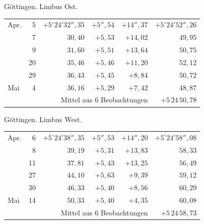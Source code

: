 \noindent\begin{minipage}[t]{.495\textwidth}\centering Göttingen. Limbus Ost.\par\smallskip
{\scriptsize\setlength{\tabcolsep}{1pt}\renewcommand{\arraystretch}{1.2}\begin{tabular}{lr|r|r|r|r|}
Apr.&5&$+5^\circ24'32''{,}35$&$+5''{,}54$&$+14''{,}37$&$+5^\circ24'52''{,}26$\\
&7&$30{,}40$&$+5{,}53$&$+14{,}02$&$49{,}95$\\
&9&$31{,}60$&$+5{,}51$&$+13{,}64$&$50{,}75$\\
&20&$35{,}46$&$+5{,}46$&$+11{,}20$&$52{,}12$\\
&29&$36{,}43$&$+5{,}45$&$+8{,}84$&$50{,}72$\\
Mai&4&$36{,}16$&$+5{,}29$&$+7{,}42$&$48{,}87$\\
\cline{6-6}\multicolumn{5}{r}{Mittel aus 6 Beobachtungen}&$+5\,24\,50{,}78$
\end{tabular}}\end{minipage}\hfill\begin{minipage}[t]{.495\textwidth}\centering Göttingen. Limbus West.\par\smallskip
{\scriptsize\setlength{\tabcolsep}{1pt}\renewcommand{\arraystretch}{1.2}\begin{tabular}{lr|r|r|r|r}
Apr.&6&$+5^\circ24'38''{,}35$&$+5''{,}53$&$+14''{,}20$&$+5^\circ24'58''{,}08$\\
&8&$39{,}19$&$+5{,}31$&$+13{,}83$&$58{,}33$\\
&11&$37{,}81$&$+5{,}43$&$+13{,}25$&$56{,}49$\\
&27&$44{,}10$&$+5{,}63$&$+9{,}39$&$59{,}12$\\
&30&$46{,}33$&$+5{,}40$&$+8{,}56$&$60{,}29$\\
Mai&14&$50{,}33$&$+5{,}40$&$+4{,}35$&$60{,}08$\\
\cline{6-6}\multicolumn{5}{r}{Mittel aus 6 Beobachtungen}&$+5\,24\,58{,}73$
\end{tabular}}\end{minipage}
\par\vspace{4mm}

